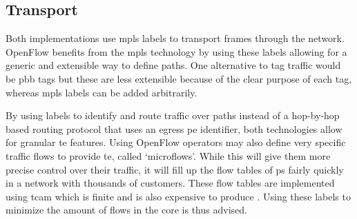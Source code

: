 
\subsection{Transport} %
\label{sub:transport}

Both implementations use \ac{mpls} labels to transport frames through the network. OpenFlow benefits from the \ac{mpls} technology by using these labels allowing for a generic and extensible way to define paths. One alternative to tag traffic would be \ac{pbb} tags but these are less extensible because of the clear purpose of each tag, whereas \ac{mpls} labels can be added arbitrarily.

By using labels to identify and route traffic over paths instead of a hop-by-hop based routing protocol that uses an egress \ac{pe} identifier, both technologies allow for granular \ac{te} features. 
%
Using OpenFlow operators may also define very specific traffic flows to provide \ac{te}, called `microflows'. While this will give them more precise control over their traffic, it will fill up the flow tables of \acp{p} fairly quickly in a network with thousands of customers. These flow tables are implemented using \ac{tcam} which is finite and is also expensive to produce \cite{tcam}. Using these labels to minimize the amount of flows in the core is thus advised.

